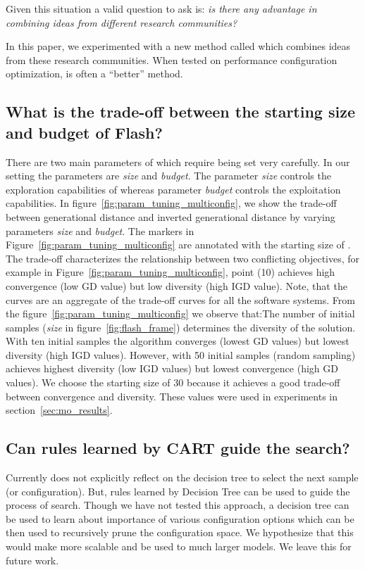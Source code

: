 \noindent Given this situation a valid question to ask is:
{\em is there any advantage in combining ideas from different research communities?}

In this paper, we experimented with a new method called \flash which combines ideas from these research communities.  When tested on performance configuration optimization, \flash is often a ``better'' method. 

\subsection{What is the trade-off between the starting size and budget of {\sc \textbf{Flash}}?}\label{sec:parameter_tuning}



There are two main parameters of \flash which require being set very carefully. In our setting the parameters are \textit{size} and \textit{budget}. The parameter \textit{size} controls the exploration capabilities of \flash whereas parameter \textit{budget} controls the exploitation capabilities. 
In figure~\ref{fig:param_tuning_multiconfig}, we show the trade-off 
between generational distance and inverted generational distance 
by varying parameters \textit{size} and \textit{budget}. 
The markers in Figure~\ref{fig:param_tuning_multiconfig} are annotated with the starting size of \flash. The trade-off characterizes the relationship between two conflicting objectives, for example in Figure~\ref{fig:param_tuning_multiconfig}, point (10) achieves high convergence (low GD value) but low diversity (high IGD value). Note, that the curves are an aggregate of the trade-off curves for all the software systems. 
From the figure~\ref{fig:param_tuning_multiconfig} we observe that:The number of initial samples (\textit{size} in figure~\ref{fig:flash_frame}) determines the diversity of the solution. With ten initial samples the algorithm converges (lowest GD values) but lowest diversity (high IGD values). However, with  50 initial samples (random sampling) \flash achieves highest diversity (low IGD values) but lowest convergence (high GD values). We choose the starting size of 30 because it achieves a good trade-off between convergence and diversity. These values were used in experiments in section~\ref{sec:mo_results}.

\subsection{Can rules learned by CART  guide the search?}
Currently \flash does not explicitly reflect on the decision tree to select the next sample (or configuration). But, rules learned by Decision Tree can be used to guide the process of search. Though we have not tested this approach, a decision tree can be used to learn about importance of various configuration options which can be then used to recursively prune the configuration space. We hypothesize that this would make \flash more scalable and be used to much larger models. We leave this for future work. 

